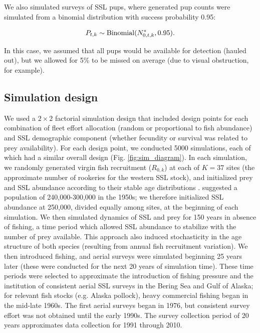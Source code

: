 \documentclass[nonumbib,leqno]{nrc1}
\begin{document}
We also simulated surveys of SSL pups, where generated pup counts were simulated from a binomial distribution with success probability 0.95:
\begin{linenomath}
  \begin{equation}
     P_{t,k} \sim {\rm Binomial}(N_{0,t,k}^*,0.95).
  \end{equation}
\end{linenomath}
In this case, we assumed that all pups would be available for detection (hauled out), but we allowed for 5\% to be missed on average (due to visual obstruction, for example).

\subsection{Simulation design}

We used a $2 \times 2$ factorial simulation design that included design points for each combination of fleet effort allocation (random or proportional to fish abundance) and SSL demographic component (whether fecundity or survival was related to prey availability).  For each design point, we conducted 5000 simulations, each of which had a similar overall design (Fig. \ref{fig:sim_diagram}).
In each simulation, we randomly generated virgin fish recruitment ($R_{0,k}$) at each of $K=37$ sites (the approximate number of rookeries for the western SSL stock), and initialized prey and SSL abundance according to their stable age distributions \citep[cf.][]{Caswell2001}.  \citet{LoughlinEtAl1992} suggested a population of 240,000-300,000 in the 1950s; we therefore initialized SSL abundance at 250,000, divided equally among sites, at the beginning of each simulation.  We then simulated dynamics of SSL and prey for 150 years in absence of fishing, a time period which allowed SSL abundance to stabilize with the number of prey available.  This approach also induced stochasticity in the age structure of both species (resulting from annual fish recruitment variation).  We then introduced fishing, and aerial surveys were simulated beginning 25 years later (these were conducted for the next 20 years of simulation time).  These time periods were selected to approximate the introduction of fishing pressure and the institution of consistent aerial SSL surveys in the Bering Sea and Gulf of Alaska; for relevant fish stocks (e.g. Alaska pollock), heavy commercial fishing began in the mid-late 1960s. The first aerial surveys began in 1976, but consistent survey effort was not obtained until the early 1990s.  The survey collection period of 20 years approximates data collection for 1991 through 2010.
\end{document}
